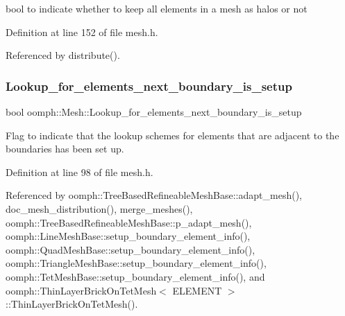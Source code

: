 bool to indicate whether to keep all elements in a mesh as halos or not 



Definition at line 152 of file mesh.\+h.



Referenced by distribute().

\mbox{\label{classoomph_1_1Mesh_a37f6d27447f643a74694012b09350ce9}} 
\subsubsection{\texorpdfstring{Lookup\+\_\+for\+\_\+elements\+\_\+next\+\_\+boundary\+\_\+is\+\_\+setup}{Lookup\_for\_elements\_next\_boundary\_is\_setup}}
{\footnotesize\ttfamily bool oomph\+::\+Mesh\+::\+Lookup\+\_\+for\+\_\+elements\+\_\+next\+\_\+boundary\+\_\+is\+\_\+setup\hspace{0.3cm}{\ttfamily [protected]}}

Flag to indicate that the lookup schemes for elements that are adjacent to the boundaries has been set up. 

Definition at line 98 of file mesh.\+h.



Referenced by oomph\+::\+Tree\+Based\+Refineable\+Mesh\+Base\+::adapt\+\_\+mesh(), doc\+\_\+mesh\+\_\+distribution(), merge\+\_\+meshes(), oomph\+::\+Tree\+Based\+Refineable\+Mesh\+Base\+::p\+\_\+adapt\+\_\+mesh(), oomph\+::\+Line\+Mesh\+Base\+::setup\+\_\+boundary\+\_\+element\+\_\+info(), oomph\+::\+Quad\+Mesh\+Base\+::setup\+\_\+boundary\+\_\+element\+\_\+info(), oomph\+::\+Triangle\+Mesh\+Base\+::setup\+\_\+boundary\+\_\+element\+\_\+info(), oomph\+::\+Tet\+Mesh\+Base\+::setup\+\_\+boundary\+\_\+element\+\_\+info(), and oomph\+::\+Thin\+Layer\+Brick\+On\+Tet\+Mesh$<$ E\+L\+E\+M\+E\+N\+T $>$\+::\+Thin\+Layer\+Brick\+On\+Tet\+Mesh().

\mbox{\label{classoomph_1_1Mesh_a0a42111e7eb200e5831f8b73c018b7dc}} 
